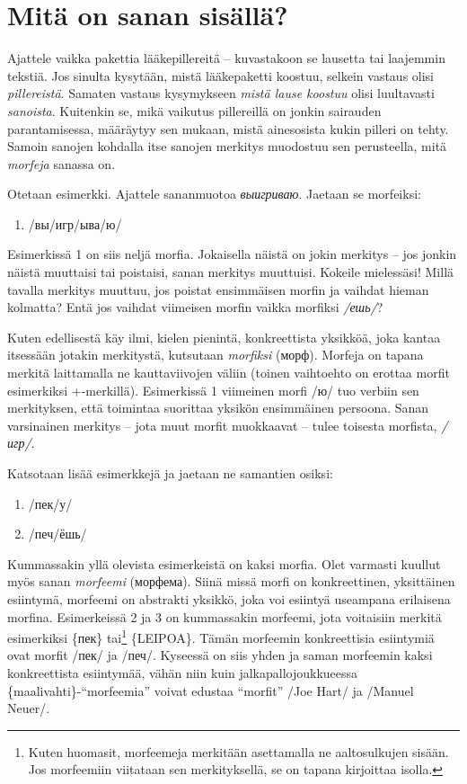 \documentclass[]{scrreprt}
\providecommand{\tightlist}{%
  \setlength{\itemsep}{0pt}\setlength{\parskip}{0pt}}
\begin{document}
\section{Mitä on sanan
sisällä?}\label{mituxe4-on-sanan-sisuxe4lluxe4}

Ajattele vaikka pakettia lääkepillereitä -- kuvastakoon se lausetta tai
laajemmin tekstiä. Jos sinulta kysytään, mistä lääkepaketti koostuu,
selkein vastaus olisi \emph{pillereistä}. Samaten vastaus kysymykseen
\emph{mistä lause koostuu} olisi luultavasti \emph{sanoista}. Kuitenkin
se, mikä vaikutus pillereillä on jonkin sairauden parantamisessa,
määräytyy sen mukaan, mistä ainesosista kukin pilleri on tehty. Samoin
sanojen kohdalla itse sanojen merkitys muodostuu sen perusteella, mitä
\emph{morfeja} sanassa on.

Otetaan esimerkki. Ajattele sananmuotoa \emph{выигриваю}. Jaetaan se
morfeiksi:

\begin{enumerate}
\def\labelenumi{(\arabic{enumi})}
\tightlist
\item
  /вы/игр/ыва/ю/
\end{enumerate}

Esimerkissä 1 on siis neljä morfia. Jokaisella näistä on jokin merkitys
-- jos jonkin näistä muuttaisi tai poistaisi, sanan merkitys muuttuisi.
Kokeile mielessäsi! Millä tavalla merkitys muuttuu, jos poistat
ensimmäisen morfin ja vaihdat hieman kolmatta? Entä jos vaihdat
viimeisen morfin vaikka morfiksi \emph{/ешь/}?

Kuten edellisestä käy ilmi, kielen pienintä, konkreettista yksikköä,
joka kantaa itsessään jotakin merkitystä, kutsutaan \emph{morfiksi}
(морф). Morfeja on tapana merkitä laittamalla ne kauttaviivojen väliin
(toinen vaihtoehto on erottaa morfit esimerkiksi +-merkillä).
Esimerkissä 1 viimeinen morfi /ю/ tuo verbiin sen merkityksen, että
toimintaa suorittaa yksikön ensimmäinen persoona. Sanan varsinainen
merkitys -- jota muut morfit muokkaavat -- tulee toisesta morfista,
\emph{/игр/}.

Katsotaan lisää esimerkkejä ja jaetaan ne samantien osiksi:

\begin{enumerate}
\def\labelenumi{(\arabic{enumi})}
\setcounter{enumi}{1}
\tightlist
\item
  /пек/у/
\item
  /печ/ёшь/
\end{enumerate}

Kummassakin yllä olevista esimerkeistä on kaksi morfia. Olet varmasti
kuullut myös sanan \emph{morfeemi} (морфема). Siinä missä morfi on
konkreettinen, yksittäinen esiintymä, morfeemi on abstrakti yksikkö,
joka voi esiintyä useampana erilaisena morfina. Esimerkeissä 2 ja 3 on
kummassakin morfeemi, jota voitaisiin merkitä esimerkiksi \{пек\}
tai\footnote{Kuten huomasit, morfeemeja merkitään asettamalla ne
  aaltosulkujen sisään. Jos morfeemiin viitataan sen merkityksellä, se
  on tapana kirjoittaa isolla.} \{LEIPOA\}. Tämän morfeemin
konkreettisia esiintymiä ovat morfit /пек/ ja /печ/. Kyseessä on siis
yhden ja saman morfeemin kaksi konkreettista esiintymää, vähän niin kuin
jalkapallojoukkueessa \{maalivahti\}-``morfeemia'' voivat edustaa
``morfit'' /Joe Hart/ ja /Manuel Neuer/.
\end{document}
